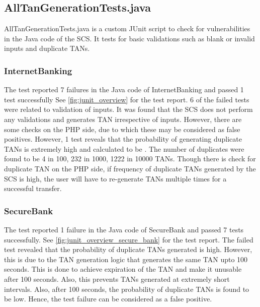 \subsection{AllTanGenerationTests.java}
AllTanGenerationTests.java is a custom JUnit script to check for vulnerabilities in the Java code of the SCS. It tests for basic validations such as blank or invalid inputs and duplicate TANs.

\subsubsection{InternetBanking}
The test reported 7 failures in the Java code of InternetBanking and passed 1 test successfully See \ref{fig:junit_overview} for the test report.
6 of the failed tests were related to validation of inputs. It was found that the SCS does not perform any validations and generates TAN irrespective of inputs. However, there are some checks on the PHP side, due to which these may be considered as false positives.
However, 1 test  reveals that the probability of generating duplicate TANs is extremely high and calculated to be . The number of duplicates were found to be 4 in 100, 232 in 1000, 1222 in 10000 TANs.
Though there is check for duplicate TAN on the PHP side, if frequency of duplicate TANs generated by the SCS is high, the user will have to re-generate TANs multiple times for a successful transfer.

\subsubsection{SecureBank}
The test reported 1 failure in the Java code of SecureBank and passed 7 tests successfully. See \ref{fig:junit_overview_secure_bank} for the test report.
The failed test  revealed that the probability of duplicate TANs generated is high. However, this is due to the TAN generation logic that generates the same TAN upto 100 seconds. This is done to achieve expiration of the TAN and make it unusable after 100 seconds. Also, this prevents TANs generated at extremely short intervals. Also, after 100 seconds, the probability of duplicate TANs is found to be low. Hence, the test failure can be considered as a false positive.

